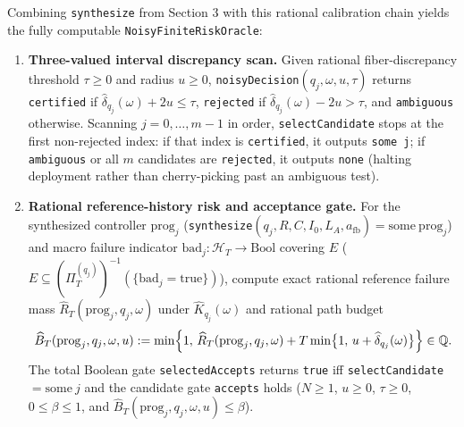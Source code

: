 \documentclass[11pt,a4paper]{article}
\newcounter{none}
\providecommand{\tightlist}{\setlength{\itemsep}{2pt}\setlength{\parskip}{0pt}}
\begin{document}
Combining \texttt{synthesize} from Section 3 with this rational
calibration chain yields the fully computable
\texttt{NoisyFiniteRiskOracle}:

\begin{enumerate}
\def\labelenumi{\arabic{enumi}.}
\tightlist
\item
  \textbf{Three-valued interval discrepancy scan.} Given rational
  fiber-discrepancy threshold \(\tau \ge 0\) and radius \(u \ge 0\),
  \texttt{noisyDecision}\((q_j, \omega, u, \tau)\) returns
  \texttt{certified} if
  \(\widehat{\delta}_{q_j}(\omega) + 2u \le \tau\), \texttt{rejected} if
  \(\widehat{\delta}_{q_j}(\omega) - 2u > \tau\), and \texttt{ambiguous}
  otherwise. Scanning \(j = 0, \dots, m-1\) in order,
  \texttt{selectCandidate} stops at the first non-rejected index: if
  that index is \texttt{certified}, it outputs \texttt{some\ j}; if
  \texttt{ambiguous} or all \(m\) candidates are \texttt{rejected}, it
  outputs \texttt{none} (halting deployment rather than cherry-picking
  past an ambiguous test).
\item
  \textbf{Rational reference-history risk and acceptance gate.} For the
  synthesized controller \(\mathrm{prog}_j\)
  (\texttt{synthesize}\((q_j, R, C, I_0, L_A, a_{\mathrm{fb}}) = \mathrm{some\ prog}_j\))
  and macro failure indicator
  \(\mathrm{bad}_j: \mathcal{H}_T \to \mathrm{Bool}\) covering \(E\)
  (\(E \subseteq (\Pi_T^{(q_j)})^{-1}(\{\mathrm{bad}_j = \mathrm{true}\})\)),
  compute exact rational reference failure mass
  \(\widehat{R}_T(\mathrm{prog}_j, q_j, \omega)\) under
  \(\widehat{K}_{q_j}(\omega)\) and rational path budget
  \[\widehat{B}_T(\mathrm{prog}_j, q_j, \omega, u) := \min\Bigl\{1,\, \widehat{R}_T(\mathrm{prog}_j, q_j, \omega) + T \min\bigl\{1,\, u + \widehat{\delta}_{q_j}(\omega)\bigr\}\Bigr\} \in \mathbb{Q}.\]
  The total Boolean gate \texttt{selectedAccepts} returns \texttt{true}
  iff \texttt{selectCandidate} \(= \mathrm{some}\ j\) and the candidate
  gate \texttt{accepts} holds (\(N \ge 1\), \(u \ge 0\), \(\tau \ge 0\),
  \(0 \le \beta \le 1\), and
  \(\widehat{B}_T(\mathrm{prog}_j, q_j, \omega, u) \le \beta\)).
\end{enumerate}

\end{document}
